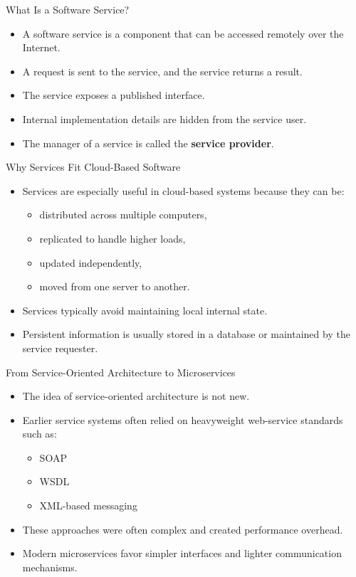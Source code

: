 \begin{frame}{What Is a Software Service?}
\begin{itemize}
    \item A software service is a component that can be accessed remotely over the Internet.
    \item A request is sent to the service, and the service returns a result.
    \item The service exposes a published interface.
    \item Internal implementation details are hidden from the service user.
    \item The manager of a service is called the \textbf{service provider}.
\end{itemize}
\end{frame}

\begin{frame}{Why Services Fit Cloud-Based Software}
\begin{itemize}
    \item Services are especially useful in cloud-based systems because they can be:
    \begin{itemize}
        \item distributed across multiple computers,
        \item replicated to handle higher loads,
        \item updated independently,
        \item moved from one server to another.
    \end{itemize}
    \item Services typically avoid maintaining local internal state.
    \item Persistent information is usually stored in a database or maintained by the service requester.
\end{itemize}
\end{frame}

\begin{frame}{From Service-Oriented Architecture to Microservices}
\begin{itemize}
    \item The idea of service-oriented architecture is not new.
    \item Earlier service systems often relied on heavyweight web-service standards such as:
    \begin{itemize}
        \item SOAP
        \item WSDL
        \item XML-based messaging
    \end{itemize}
    \item These approaches were often complex and created performance overhead.
    \item Modern microservices favor simpler interfaces and lighter communication mechanisms.
\end{itemize}
\end{frame}

